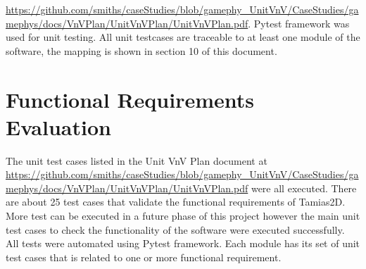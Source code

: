 \documentclass[12pt, titlepage]{article}
\newcommand{\progname}{Tamias2D}
\begin{document}
\url{https://github.com/smiths/caseStudies/blob/gamephy_UnitVnV/CaseStudies/gamephys/docs/VnVPlan/UnitVnVPlan/UnitVnVPlan.pdf}. Pytest framework was used for unit testing. All unit testcases are traceable to at least one module of the software, the mapping is shown in section 10 of this document.


\section{Functional Requirements Evaluation}
The unit test cases listed in the Unit VnV Plan document at \url{https://github.com/smiths/caseStudies/blob/gamephy_UnitVnV/CaseStudies/gamephys/docs/VnVPlan/UnitVnVPlan/UnitVnVPlan.pdf} were all executed. There are about 25 test cases that validate the functional requirements of \progname . More test can be executed in a future phase of this project however the main unit test cases to check the functionality of the software were executed successfully. All tests were automated using Pytest framework. Each module has its set of unit test cases that is related to one or more functional requirement.
\end{document}
